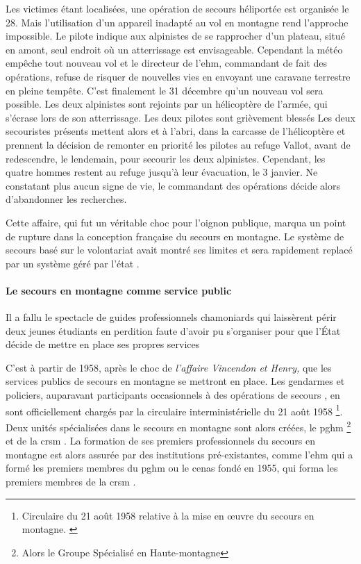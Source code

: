 Les victimes étant localisées, une opération de secours héliportée est
organisée le 28. Mais l'utilisation d'un appareil inadapté au vol en
montagne rend l'approche impossible. Le pilote indique aux alpinistes
de se rapprocher d'un plateau, situé en amont, seul endroit où un
atterrissage est envisageable. Cependant la météo empêche tout nouveau
vol et le directeur de l'\ac{ehm}, commandant de fait des opérations,
refuse de risquer de nouvelles vies en envoyant une caravane terrestre
en pleine tempête. C'est finalement le 31 décembre qu'un nouveau vol
sera possible. Les deux alpinistes sont rejoints par un hélicoptère de
l'armée, qui s'écrase lors de son atterrissage. Les deux pilotes sont
grièvement blessés Les deux secouristes présents mettent alors
 et  à l'abri, dans la carcasse de
l'hélicoptère et prennent la décision de remonter en priorité les
pilotes au refuge Vallot, avant de redescendre, le lendemain, pour
secourir les deux alpinistes. Cependant, les quatre hommes restent au
refuge jusqu’à leur évacuation, le 3 janvier. Ne constatant plus aucun
signe de vie, le commandant des opérations décide alors d'abandonner
les recherches.

Cette affaire, qui fut un véritable choc pour l’oignon publique,
marqua un point de rupture dans la conception française du secours en
montagne. Le système de secours basé sur le volontariat avait montré
ses limites et sera rapidement replacé par un système géré par l'état
\autocite{Ballu1997}.

\paragraph{Le secours en montagne comme service public}
\label{par:1-1-1-1-2}

\begin{displayquote}
  \og Il a fallu le spectacle de guides professionnels chamoniards
  qui laissèrent périr deux jeunes étudiants en perdition faute
  d'avoir pu s'organiser pour que l'État décide de mettre en place ses
  propres services \textelp{}\fg{} \autocite{Descamps2018}
\end{displayquote}

C'est à partir de 1958, après le choc de \emph{l'affaire Vincendon et
  Henry,} que les services publics de secours en montagne se mettront
en place. Les gendarmes et policiers, auparavant participants
occasionnels à des opérations de secours
\autocite{Mollaret2016,CFDLD}, en sont officiellement chargés par la
circulaire interministérielle du 21 août 1958 \footnote{Circulaire  du 21 août 1958 relative à la mise en œuvre du secours en
  montagne. \label{fn:circulaire_21_aout_58}}. Deux unités
spécialisées dans le secours en montagne sont alors créées, le
\ac{pghm} \footnote{Alors le Groupe Spécialisé en Haute-montagne} et
de la \ac{crsm} \autocite{Halle2007}. La formation de ses premiers
professionnels du secours en montagne est alors assurée par des
institutions pré-existantes, comme l'\ac{ehm} qui a formé les premiers
membres du \ac{pghm} ou le \ac{cenas} fondé en 1955, qui forma les
premiers membres de la \ac{crsm} \autocite{Mezin2016}.

